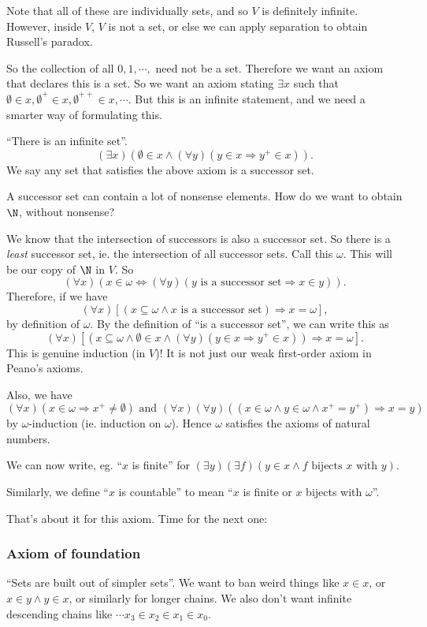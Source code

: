\documentclass[a4paper]{article}
\begin{document}
Note that all of these are individually sets, and so $V$ is definitely infinite. However, inside $V$, $V$ is not a set, or else we can apply separation to obtain Russell's paradox.

So the collection of all $0, 1, \cdots, $ need not be a set. Therefore we want an axiom that declares this is a set. So we want an axiom stating $\exists x$ such that $\emptyset\in x, \emptyset^+\in x, \emptyset^{++}\in x, \cdots$. But this is an infinite statement, and we need a smarter way of formulating this.

\begin{axiom}
  ``There is an infinite set''.
  \[
    (\exists x)(\emptyset\in x \wedge (\forall y)(y\in x \Rightarrow y^+ \in x)).
  \]
  We say any set that satisfies the above axiom is a successor set.
\end{axiom}
A successor set can contain a lot of nonsense elements. How do we want to obtain $\N$, without nonsense?

We know that the intersection of successors is also a successor set. So there is a \emph{least} successor set, ie. the intersection of all successor sets. Call this $\omega$. This will be our copy of $\N$ in $V$. So
\[
  (\forall x)(x\in \omega \Leftrightarrow (\forall y)(y\text{ is a successor set} \Rightarrow x \in y)).
\]
Therefore, if we have
\[
  (\forall x)[(x \subseteq \omega\wedge x\text{ is a successor set}) \Rightarrow x = \omega],
\]
by definition of $\omega$. By the definition of ``is a successor set'', we can write this as
\[
  (\forall x)[(x\subseteq \omega \wedge \emptyset\in x \wedge (\forall y)(y\in x \Rightarrow y^+ \in x))\Rightarrow x = \omega].
\]
This is genuine induction (in $V$)! It is not just our weak first-order axiom in Peano's axioms.

Also, we have
\[
  (\forall x)(x\in \omega \Rightarrow x^+ \not = \emptyset)\text{ and }(\forall x)(\forall y)((x\in \omega \wedge y\in \omega \wedge x^+ = y^+) \Rightarrow x = y)
\]
by $\omega$-induction (ie. induction on $\omega$). Hence $\omega$ satisfies the axioms of natural numbers.

We can now write, eg. ``$x$ is finite'' for $(\exists y)(\exists f)(y\in x \wedge f\text{ bijects }x\text{ with }y)$.

Similarly, we define ``$x$ is countable'' to mean ``$x$ is finite or $x$ bijects with $\omega$''.

That's about it for this axiom. Time for the next one:
\subsubsection*{Axiom of foundation}
``Sets are built out of simpler sets''. We want to ban weird things like $x\in x$, or $x\in y\wedge y\in x$, or similarly for longer chains. We also don't want infinite descending chains like $\cdots x_3 \in x_2 \in x_1 \in x_0$.
\end{document}
